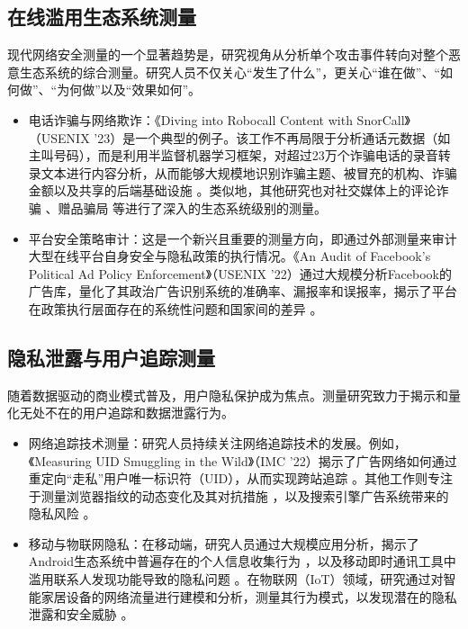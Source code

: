 \documentclass[conference]{IEEEtran}
\begin{document}
\subsection{在线滥用生态系统测量}
现代网络安全测量的一个显著趋势是，研究视角从分析单个攻击事件转向对整个恶意生态系统的综合测量。研究人员不仅关心“发生了什么”，更关心“谁在做”、“如何做”、“为何做”以及“效果如何”。
\begin{itemize}
\item 电话诈骗与网络欺诈：《Diving into Robocall Content with SnorCall》（USENIX '23）是一个典型的例子。该工作不再局限于分析通话元数据（如主叫号码），而是利用半监督机器学习框架，对超过23万个诈骗电话的录音转录文本进行内容分析，从而能够大规模地识别诈骗主题、被冒充的机构、诈骗金额以及共享的后端基础设施 。类似地，其他研究也对社交媒体上的评论诈骗 、赠品骗局  等进行了深入的生态系统级别的测量。
\item 平台安全策略审计：这是一个新兴且重要的测量方向，即通过外部测量来审计大型在线平台自身安全与隐私政策的执行情况。《An Audit of Facebook's Political Ad Policy Enforcement》（USENIX '22）通过大规模分析Facebook的广告库，量化了其政治广告识别系统的准确率、漏报率和误报率，揭示了平台在政策执行层面存在的系统性问题和国家间的差异 。
\end{itemize}

\subsection{隐私泄露与用户追踪测量}
随着数据驱动的商业模式普及，用户隐私保护成为焦点。测量研究致力于揭示和量化无处不在的用户追踪和数据泄露行为。
\begin{itemize}
\item 网络追踪技术测量：研究人员持续关注网络追踪技术的发展。例如，《Measuring UID Smuggling in the Wild》（IMC '22）揭示了广告网络如何通过重定向“走私”用户唯一标识符（UID），从而实现跨站追踪 。其他工作则专注于测量浏览器指纹的动态变化及其对抗措施 ，以及搜索引擎广告系统带来的隐私风险 。
\item 移动与物联网隐私：在移动端，研究人员通过大规模应用分析，揭示了Android生态系统中普遍存在的个人信息收集行为 ，以及移动即时通讯工具中滥用联系人发现功能导致的隐私问题 。在物联网（IoT）领域，研究通过对智能家居设备的网络流量进行建模和分析，测量其行为模式，以发现潜在的隐私泄露和安全威胁 。
\end{itemize}
\end{document}
